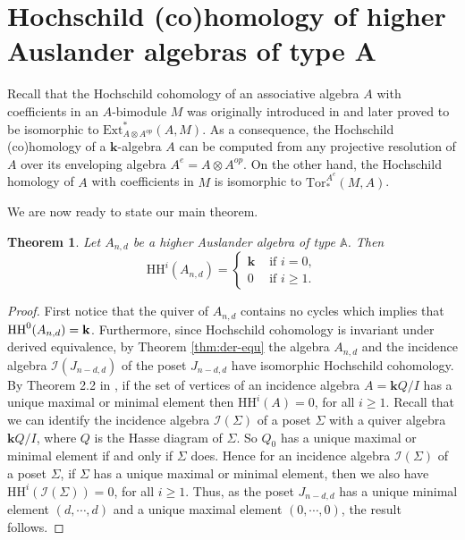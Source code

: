\documentclass{amsart}
\newcommand{\A}{\mathbb{A}}
\newcommand{\bk}{\mathbf{k}}
\newcommand{\I}{\mathcal{I}}
\newcommand{\Ext}{\mathrm{Ext}}
\newcommand{\Tor}{\mathrm{Tor}}
\newcommand{\HH}{\mathrm{HH}}
\theoremstyle{plain}
\newtheorem{Thm}{Theorem}[section]
\theoremstyle{definition}
\numberwithin{equation}{section}
\begin{document}
\section{Hochschild (co)homology of higher Auslander algebras of type A}

Recall that the Hochschild cohomology of an associative algebra $A$ with coefficients in an $A$-bimodule $M$ was originally introduced in \cite{Hochschild45} and later proved to be isomorphic to $\Ext_{A\otimes A^{op}}^*(A,M)$. As a consequence, the Hochschild (co)homology of a $\bk$-algebra $A$
can be computed from any projective resolution of $A$ over its enveloping algebra $A^e=A\otimes A^{op}$.
On the other hand, the Hochschild homology of $A$ with coefficients in $M$ is isomorphic to
$\Tor^{A^e}_*(M,A)$. 


We are now ready to state  our main theorem.

\begin{Thm}\label{thm:Hoch-cohomology}
    Let $A_{n,d}$ be a higher Auslander algebra of type $\A$.  Then \[\HH^i(A_{n,d})=\begin{cases}
        \bk & \text{ if $i=0$},\\ 0 & \text{ if $i\ge 1$}.
    \end{cases}\]
\end{Thm}

\begin{proof}
   First notice that the quiver of $A_{n,d}$ contains no cycles which implies that  \sloppy ${\rm HH}^0(A_{n,d})=\bk$. 
    Furthermore, since Hochschild cohomology is invariant under derived equivalence, by 
    Theorem \ref{thm:der-equ} the algebra $A_{n,d}$ and the incidence algebra $\I(J_{n-d,d})$ of the poset $J_{n-d,d}$ have  isomorphic Hochschild cohomology. 
   By Theorem 2.2 in \cite{GaticaRedondo01}, if the set of vertices of an incidence algebra $A=\bk Q/I$ has a unique maximal or minimal element then $\HH^i(A)=0$, for all $i\ge 1$. 
   Recall that we can identify the incidence algebra $\I(\Sigma)$ of a poset $\Sigma$ with a quiver algebra $\bk Q/I$, where $Q$ is the Hasse diagram of $\Sigma$. So $Q_0$ has a unique maximal or minimal element if and only if $\Sigma$ does.
   Hence for an incidence algebra  $\I(\Sigma)$  of a poset $\Sigma$, if  $\Sigma$ has a unique maximal or minimal element, then we also have $\HH^i(\I(\Sigma))=0$, for all $i\ge 1$.
    Thus, as  
    the poset $J_{n-d,d}$ has a unique minimal element $(d,\cdots,d)$ and a unique maximal element $(0,\cdots,0)$, the result follows.
\end{proof}
\end{document}
